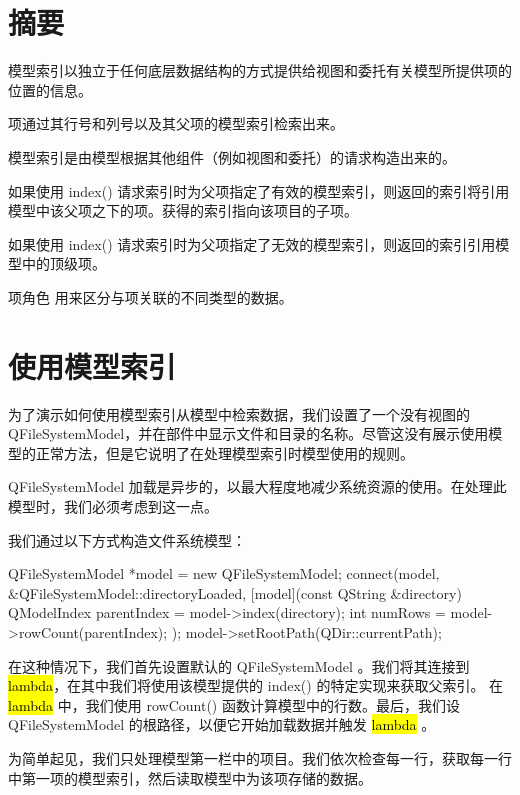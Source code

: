 \section{摘要}

\begin{compactitem}
\item 模型索引以独立于任何底层数据结构的方式提供给视图和委托有关模型所提供项的位置的信息。
\item 项通过其行号和列号以及其父项的模型索引检索出来。
\item 模型索引是由模型根据其他组件（例如视图和委托）的请求构造出来的。
\item 如果使用 index() 请求索引时为父项指定了有效的模型索引，则返回的索引将引用模型中该父项之下的项。获得的索引指向该项目的子项。
\item 如果使用 index() 请求索引时为父项指定了无效的模型索引，则返回的索引引用模型中的顶级项。
\item 项角色 用来区分与项关联的不同类型的数据。
\end{compactitem}

\section{使用模型索引}

为了演示如何使用模型索引从模型中检索数据，我们设置了一个没有视图的 QFileSystemModel，并在部件中显示文件和目录的名称。尽管这没有展示使用模型的正常方法，但是它说明了在处理模型索引时模型使用的规则。

QFileSystemModel 加载是异步的，以最大程度地减少系统资源的使用。在处理此模型时，我们必须考虑到这一点。

我们通过以下方式构造文件系统模型：

\begin{cppcode}
QFileSystemModel *model = new QFileSystemModel;
connect(model, &QFileSystemModel::directoryLoaded, [model](const QString &directory) {
    QModelIndex parentIndex = model->index(directory);
    int numRows = model->rowCount(parentIndex);
});
model->setRootPath(QDir::currentPath);
\end{cppcode}

在这种情况下，我们首先设置默认的 QFileSystemModel 。我们将其连接到 \hl{lambda}，在其中我们将使用该模型提供的 index() 的特定实现来获取父索引。 在 \hl{lambda} 中，我们使用 rowCount() 函数计算模型中的行数。最后，我们设 QFileSystemModel 的根路径，以便它开始加载数据并触发 \hl{lambda} 。

为简单起见，我们只处理模型第一栏中的项目。我们依次检查每一行，获取每一行中第一项的模型索引，然后读取模型中为该项存储的数据。


